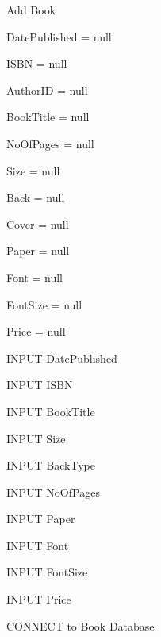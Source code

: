 \begin{algorithm}[H]
    \caption{Add Book}
\begin{algorithmic}[1]



DatePublished = null

ISBN = null

AuthorID = null

BookTitle = null

NoOfPages = null

Size = null

Back = null

Cover = null

Paper = null

Font = null

FontSize = null

Price = null


    INPUT DatePublished

\EndWhile


    INPUT ISBN

\EndWhile


    INPUT BookTitle

\EndWhile


    INPUT Size

\EndWhile


    INPUT BackType

\EndWhile


    INPUT NoOfPages

\EndWhile


    INPUT Paper

\EndWhile


    INPUT Font

\EndWhile


    INPUT FontSize

\EndWhile


    INPUT Price

\EndWhile

    
    CONNECT to Book Database
    
\EndIf

\EndFunction
\end{algorithmic}
\end{algorithm}

